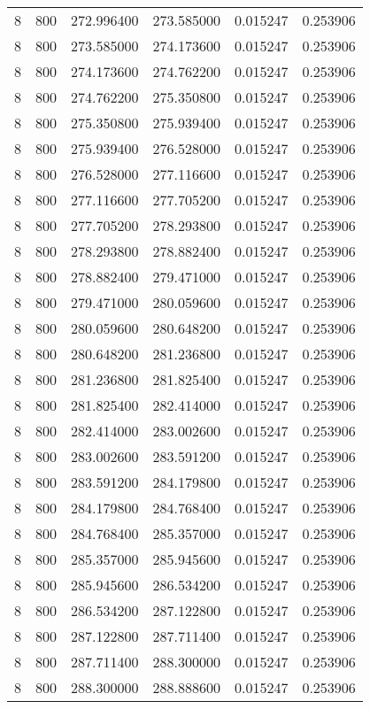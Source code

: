 \begin{longtable}{rrrrrr}
8 & 800 & 272.996400 & 273.585000 & 0.015247 & 0.253906 \\
8 & 800 & 273.585000 & 274.173600 & 0.015247 & 0.253906 \\
8 & 800 & 274.173600 & 274.762200 & 0.015247 & 0.253906 \\
8 & 800 & 274.762200 & 275.350800 & 0.015247 & 0.253906 \\
8 & 800 & 275.350800 & 275.939400 & 0.015247 & 0.253906 \\
8 & 800 & 275.939400 & 276.528000 & 0.015247 & 0.253906 \\
8 & 800 & 276.528000 & 277.116600 & 0.015247 & 0.253906 \\
8 & 800 & 277.116600 & 277.705200 & 0.015247 & 0.253906 \\
8 & 800 & 277.705200 & 278.293800 & 0.015247 & 0.253906 \\
8 & 800 & 278.293800 & 278.882400 & 0.015247 & 0.253906 \\
8 & 800 & 278.882400 & 279.471000 & 0.015247 & 0.253906 \\
8 & 800 & 279.471000 & 280.059600 & 0.015247 & 0.253906 \\
8 & 800 & 280.059600 & 280.648200 & 0.015247 & 0.253906 \\
8 & 800 & 280.648200 & 281.236800 & 0.015247 & 0.253906 \\
8 & 800 & 281.236800 & 281.825400 & 0.015247 & 0.253906 \\
8 & 800 & 281.825400 & 282.414000 & 0.015247 & 0.253906 \\
8 & 800 & 282.414000 & 283.002600 & 0.015247 & 0.253906 \\
8 & 800 & 283.002600 & 283.591200 & 0.015247 & 0.253906 \\
8 & 800 & 283.591200 & 284.179800 & 0.015247 & 0.253906 \\
8 & 800 & 284.179800 & 284.768400 & 0.015247 & 0.253906 \\
8 & 800 & 284.768400 & 285.357000 & 0.015247 & 0.253906 \\
8 & 800 & 285.357000 & 285.945600 & 0.015247 & 0.253906 \\
8 & 800 & 285.945600 & 286.534200 & 0.015247 & 0.253906 \\
8 & 800 & 286.534200 & 287.122800 & 0.015247 & 0.253906 \\
8 & 800 & 287.122800 & 287.711400 & 0.015247 & 0.253906 \\
8 & 800 & 287.711400 & 288.300000 & 0.015247 & 0.253906 \\
8 & 800 & 288.300000 & 288.888600 & 0.015247 & 0.253906 \\

\end{longtable}
